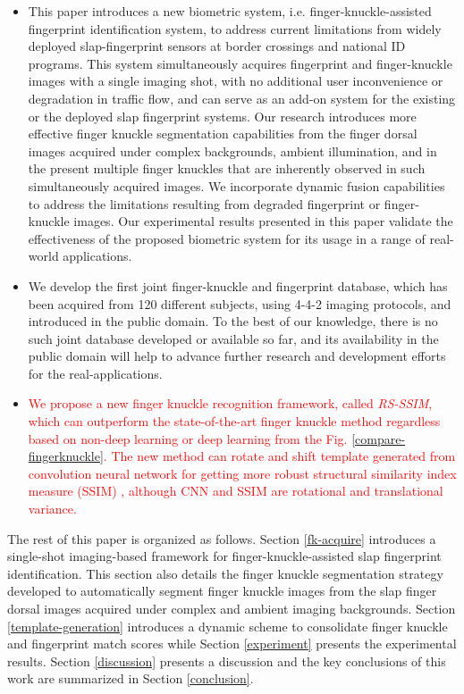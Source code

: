 \begin{itemize}
    \item This paper introduces a new biometric system, i.e. finger-knuckle-assisted fingerprint identification system, to address current limitations from widely deployed slap-fingerprint sensors at border crossings and national ID programs. This system simultaneously acquires fingerprint and finger-knuckle images with a single imaging shot, with no additional user inconvenience or degradation in traffic flow, and can serve as an add-on system for the existing or the deployed slap fingerprint systems. Our research introduces more effective finger knuckle segmentation capabilities from the finger dorsal images acquired under complex backgrounds, ambient illumination, and in the present multiple finger knuckles that are inherently observed in such simultaneously acquired images. We incorporate dynamic fusion capabilities to address the limitations resulting from degraded fingerprint or finger-knuckle images. Our experimental results presented in this paper validate the effectiveness of the proposed biometric system for its usage in a range of real-world applications. 
    \item We develop the first joint finger-knuckle and fingerprint database, which has been acquired from 120 different subjects, using 4-4-2 imaging protocols, and introduced in the public domain. To the best of our knowledge, there is no such joint database developed or available so far, and its availability in the public domain will help to advance further research and development efforts for the real-applications. 
    \item \textcolor{red}{We propose a new finger knuckle recognition framework, called \textit{RS-SSIM}, which can outperform the state-of-the-art finger knuckle method regardless based on non-deep learning or deep learning from the Fig. \ref{compare-fingerknuckle}. The new method can rotate and shift template generated from convolution neural network for getting more robust structural similarity index measure (SSIM) \cite{wang2004image}, although CNN and SSIM are rotational and translational variance.} 
\end{itemize}


The rest of this paper is organized as follows. Section \ref{fk-acquire} introduces a single-shot imaging-based framework for finger-knuckle-assisted slap fingerprint identification. This section also details the finger knuckle segmentation strategy developed to automatically segment finger knuckle images from the slap finger dorsal images acquired under complex and ambient imaging backgrounds. Section \ref{template-generation} introduces a dynamic scheme to consolidate finger knuckle and fingerprint match scores while Section \ref{experiment} presents the experimental results. Section \ref{discussion} presents a discussion and the key conclusions of this work are summarized in Section \ref{conclusion}.
